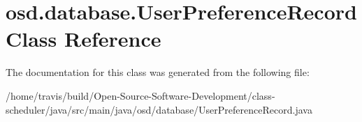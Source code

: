 \hypertarget{classosd_1_1database_1_1_user_preference_record}{\section{osd.\-database.\-User\-Preference\-Record Class Reference}
\label{classosd_1_1database_1_1_user_preference_record}
}


The documentation for this class was generated from the following file\-:\begin{DoxyCompactItemize}
\item 
/home/travis/build/\-Open-\/\-Source-\/\-Software-\/\-Development/class-\/scheduler/java/src/main/java/osd/database/User\-Preference\-Record.\-java\end{DoxyCompactItemize}
